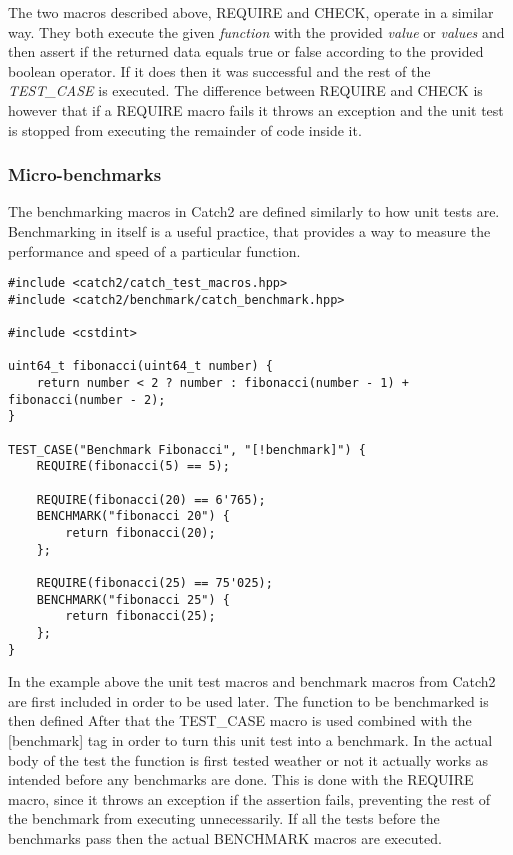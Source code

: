 The two macros described above, REQUIRE and CHECK, operate in a similar way. They both execute the given \textit{function} with the provided \textit{value} or \textit{values}
and then assert if the returned data equals true or false according to the provided boolean operator. If it does then it was successful and the rest of the \textit{TEST\_CASE} is executed. The difference 
between REQUIRE and CHECK is however that if a REQUIRE macro fails it throws an exception and the unit test is stopped from executing the remainder of code inside it.

\subsubsection{Micro-benchmarks}
The benchmarking macros in Catch2 are defined similarly to how unit tests are. Benchmarking in itself is a useful practice, that provides a way to measure the performance
and speed of a particular function.

\begin{verbatim}
#include <catch2/catch_test_macros.hpp>
#include <catch2/benchmark/catch_benchmark.hpp>

#include <cstdint>

uint64_t fibonacci(uint64_t number) {
    return number < 2 ? number : fibonacci(number - 1) + fibonacci(number - 2);
}

TEST_CASE("Benchmark Fibonacci", "[!benchmark]") {
    REQUIRE(fibonacci(5) == 5);

    REQUIRE(fibonacci(20) == 6'765);
    BENCHMARK("fibonacci 20") {
        return fibonacci(20);
    };

    REQUIRE(fibonacci(25) == 75'025);
    BENCHMARK("fibonacci 25") {
        return fibonacci(25);
    };
}
\end{verbatim}

In the example above the unit test macros and benchmark macros from Catch2 are first included in order to be used later. The function to be benchmarked is then defined
After that the TEST\_CASE macro is used combined with the [\!benchmark] tag in order to turn this unit test into a benchmark. In the actual body of the test the function
is first tested weather or not it actually works as intended before any benchmarks are done. This is done with the REQUIRE macro, since it throws an exception if the 
assertion fails, preventing the rest of the benchmark from executing unnecessarily. If all the tests before the benchmarks pass then the actual BENCHMARK macros are
executed.

